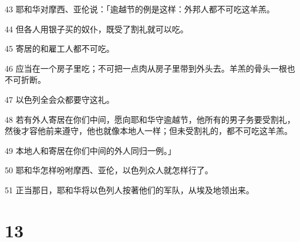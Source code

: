 \par 43 耶和华对摩西、亚伦说：「逾越节的例是这样：外邦人都不可吃这羊羔。
\par 44 但各人用银子买的奴仆，既受了割礼就可以吃。
\par 45 寄居的和雇工人都不可吃。
\par 46 应当在一个房子里吃；不可把一点肉从房子里带到外头去。羊羔的骨头一根也不可折断。
\par 47 以色列全会众都要守这礼。
\par 48 若有外人寄居在你们中间，愿向耶和华守逾越节，他所有的男子务要受割礼，然後才容他前来遵守，他也就像本地人一样；但未受割礼的，都不可吃这羊羔。
\par 49 本地人和寄居在你们中间的外人同归一例。」
\par 50 耶和华怎样吩咐摩西、亚伦，以色列众人就怎样行了。
\par 51 正当那日，耶和华将以色列人按著他们的军队，从埃及地领出来。

\chapter{13}

